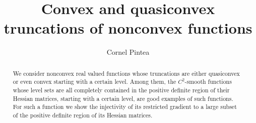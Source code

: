 \documentclass[12pt,twoside,reqno]{amsart}
\theoremstyle{definition}
\numberwithin{equation}{section}
\begin{document}
\setcounter{page}{1}







\vspace*{1.0cm}
\title[Convex and quasiconvex truncations of nonconvex functions]
{Convex and quasiconvex truncations of nonconvex functions}
\author[C. Pintea]{Cornel Pintea}
\address{
Babe\c s-Bolyai University, Faculty of Mathematics and Computer
Science, Department of Mathematics, Str. Kog\u alniceanu no. 1, 400084 Cluj-Napoca, Romania\\
}
\begin{abstract}
We consider nonconvex real valued functions whose truncations are either quasiconvex or even convex starting with a certain level.
Among them, the $C^2$-smooth functions whose level sets are all completely contained in the positive definite region of their Hessian matrices, 
starting with a certain level, are good examples of such functions. For such a function we show the injectivity of its restricted gradient to a large subset of the 
positive definite region of its Hessian matrices.
\end{abstract}
\begingroup
\renewcommand{\thefootnote}{}
\endgroup

\maketitle
\vspace*{-0.6cm}
\end{document}
